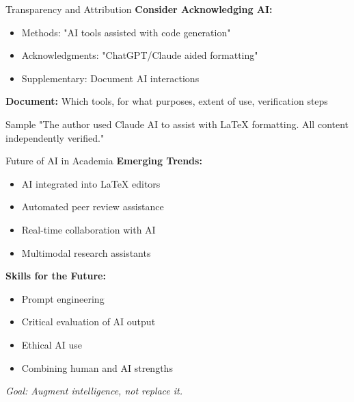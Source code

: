 \documentclass[aspectratio=169]{beamer}
\begin{document}
	\begin{frame}{Transparency and Attribution}
		\textbf{Consider Acknowledging AI:}
		
		\begin{itemize}
			\item Methods: "AI tools assisted with code generation"
			\item Acknowledgments: "ChatGPT/Claude aided formatting"
			\item Supplementary: Document AI interactions
		\end{itemize}
		
		\vspace{0.5em}
		
		\textbf{Document:} Which tools, for what purposes, extent of use, verification steps
		
		\vspace{0.5em}
		
		\begin{exampleblock}{Sample}
			"The author used Claude AI to assist with LaTeX formatting. All content independently verified."
		\end{exampleblock}
	\end{frame}
	
	\begin{frame}{Future of AI in Academia}
		\textbf{Emerging Trends:}
		\begin{itemize}
			\item AI integrated into LaTeX editors
			\item Automated peer review assistance
			\item Real-time collaboration with AI
			\item Multimodal research assistants
		\end{itemize}
		
		\vspace{0.5em}
		
		\textbf{Skills for the Future:}
		\begin{itemize}
			\item Prompt engineering
			\item Critical evaluation of AI output
			\item Ethical AI use
			\item Combining human and AI strengths
		\end{itemize}
		
		\vspace{0.3em}
		
		\textit{Goal: Augment intelligence, not replace it.}
	\end{frame}
	
\end{document}

